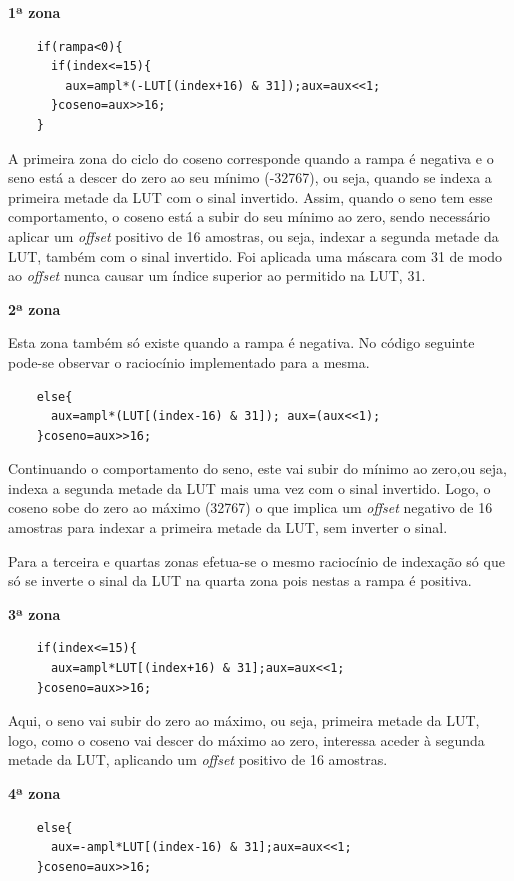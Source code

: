 \documentclass[11pt]{article}
\numberwithin{equation}{section}
\begin{document}
\textbf{1ª zona}
\begin{lstlisting}
	if(rampa<0){
	  if(index<=15){
	    aux=ampl*(-LUT[(index+16) & 31]);aux=aux<<1;
	  }coseno=aux>>16;
	}
\end{lstlisting}

A primeira zona do ciclo do coseno corresponde quando a rampa é negativa e o seno está a descer do zero ao seu mínimo (-32767), ou seja, quando se indexa a primeira metade da LUT com o sinal invertido. Assim, quando o seno tem esse comportamento, o coseno está a subir do seu mínimo ao zero, sendo necessário aplicar um \textit{offset} positivo de 16 amostras, ou seja, indexar a segunda metade da LUT, também com o sinal invertido. Foi aplicada uma máscara com 31 de modo ao \textit{offset} nunca causar um índice superior ao permitido na LUT, 31.
\vspace{1mm}

\textbf{2ª zona}

Esta zona também só existe quando a rampa é negativa. No código seguinte pode-se observar o raciocínio implementado para a mesma.
\begin{lstlisting}
	else{
	  aux=ampl*(LUT[(index-16) & 31]); aux=(aux<<1);
	}coseno=aux>>16;
\end{lstlisting}

Continuando o comportamento do seno, este vai subir do mínimo ao zero,ou seja, indexa a segunda metade da LUT mais uma vez com o sinal invertido. Logo, o coseno sobe do zero ao máximo (32767) o que implica um \textit{offset} negativo de 16 amostras para indexar a primeira metade da LUT, sem inverter o sinal.

Para a terceira e quartas zonas efetua-se o mesmo raciocínio de indexação só que só se inverte o sinal da LUT na quarta zona pois nestas a rampa é positiva.
\vspace{1mm}

\textbf{3ª zona}
\begin{lstlisting}
	if(index<=15){
	  aux=ampl*LUT[(index+16) & 31];aux=aux<<1;
	}coseno=aux>>16;
\end{lstlisting}

Aqui, o seno vai subir do zero ao máximo, ou seja, primeira metade da LUT, logo, como o coseno vai descer do máximo ao zero, interessa aceder à segunda metade da LUT, aplicando um \textit{offset} positivo de 16 amostras.
\vspace{1mm}

\textbf{4ª zona}
\begin{lstlisting}
	else{
	  aux=-ampl*LUT[(index-16) & 31];aux=aux<<1;
	}coseno=aux>>16;
\end{lstlisting}
\end{document}
